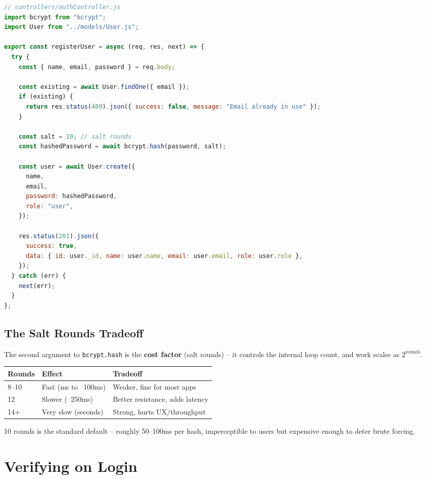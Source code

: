 \begin{lstlisting}[language=JavaScript]
// controllers/authController.js
import bcrypt from "bcrypt";
import User from "../models/User.js";

export const registerUser = async (req, res, next) => {
  try {
    const { name, email, password } = req.body;

    const existing = await User.findOne({ email });
    if (existing) {
      return res.status(409).json({ success: false, message: "Email already in use" });
    }

    const salt = 10; // salt rounds
    const hashedPassword = await bcrypt.hash(password, salt);

    const user = await User.create({
      name,
      email,
      password: hashedPassword,
      role: "user",
    });

    res.status(201).json({
      success: true,
      data: { id: user._id, name: user.name, email: user.email, role: user.role },
    });
  } catch (err) {
    next(err);
  }
};
\end{lstlisting}

\subsection{The Salt Rounds Tradeoff}

The second argument to \texttt{bcrypt.hash} is the \textbf{cost factor} (salt rounds) -- it controls the internal loop count, and work scales as $2^{\text{rounds}}$.

\begin{center}
\begin{tabularx}{\textwidth}{lXX}
\toprule
\textbf{Rounds} & \textbf{Effect} & \textbf{Tradeoff} \\
\midrule
8--10 & Fast (ms to ~100ms) & Weaker, fine for most apps \\
12 & Slower (~250ms) & Better resistance, adds latency \\
14+ & Very slow (seconds) & Strong, hurts UX/throughput \\
\bottomrule
\end{tabularx}
\end{center}

\begin{notebox}[NOTE]
10 rounds is the standard default -- roughly 50--100ms per hash, imperceptible to users but expensive enough to deter brute forcing.
\end{notebox}

\section{Verifying on Login}

